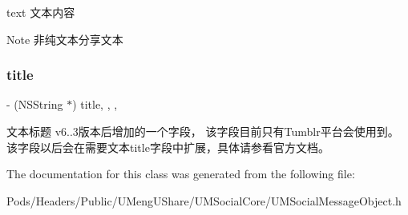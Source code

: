 text 文本内容 \begin{DoxyNote}{Note}
非纯文本分享文本 
\end{DoxyNote}
\mbox{\label{interface_u_m_social_message_object_ae3dfb1104f916cef547f536c9b94d9cb}} 
\subsubsection{\texorpdfstring{title}{title}}
{\footnotesize\ttfamily -\/ (N\+S\+String $\ast$) title\hspace{0.3cm}{\ttfamily [read]}, {\ttfamily [write]}, {\ttfamily [nonatomic]}, {\ttfamily [copy]}}

文本标题  v6..\+3版本后增加的一个字段，  该字段目前只有\+Tumblr平台会使用到。  该字段以后会在需要文本title字段中扩展，具体请参看官方文档。 

The documentation for this class was generated from the following file\+:\begin{DoxyCompactItemize}
\item 
Pods/\+Headers/\+Public/\+U\+Meng\+U\+Share/\+U\+M\+Social\+Core/U\+M\+Social\+Message\+Object.\+h\end{DoxyCompactItemize}
